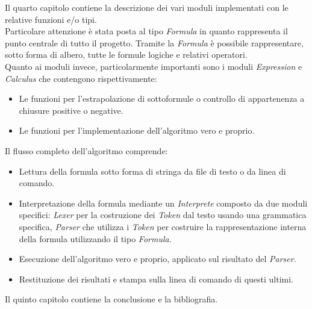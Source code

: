\documentclass{oist}
\begin{document}
Il quarto capitolo contiene la descrizione dei vari moduli implementati con le relative funzioni e/o tipi. \\
Particolare attenzione è stata posta al tipo \textit{Formula} in quanto rappresenta il punto centrale di tutto il progetto. Tramite la \textit{Formula} è possibile rappresentare, sotto forma di albero, tutte le formule logiche e relativi operatori. \\
Quanto ai moduli invece, particolarmente importanti sono i moduli \textit{Expression} e \textit{Calculus} che contengono rispettivamente:
\begin{itemize}
    \item Le funzioni per l'estrapolazione di sottoformule o controllo di appartenenza a chiusure positive o negative.
    \item Le funzioni per l'implementazione dell'algoritmo vero e proprio.
\end{itemize}
Il flusso completo dell'algoritmo comprende:
\begin{itemize}
    \item Lettura della formula sotto forma di stringa da file di testo o da linea di comando.
    \item Interpretazione della formula mediante un \textit{Interprete} composto da due moduli specifici: \textit{Lexer} per la costruzione dei \textit{Token} dal testo usando una grammatica specifica, \textit{Parser} che utilizza i \textit{Token} per costruire la rappresentazione interna della formula utilizzando il tipo \textit{Formula}.
    \item Esecuzione dell'algoritmo vero e proprio, applicato sul risultato del \textit{Parser}.
    \item Restituzione dei risultati e stampa sulla linea di comando di questi ultimi.
\end{itemize}

Il quinto capitolo contiene la conclusione e la bibliografia. \\

\printbibliography
{}
\end{document}
